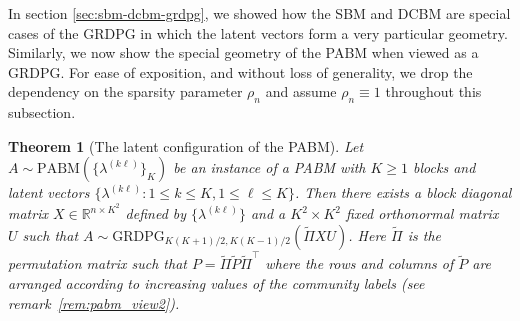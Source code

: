 \documentclass[
  12pt,
]{article}
\newtheorem{theorem}{Theorem}[section]
\theoremstyle{definition}
\theoremstyle{definition}
\theoremstyle{definition}
\theoremstyle{definition}
\theoremstyle{remark}
\begin{document}
In section \ref{sec:sbm-dcbm-grdpg}, we showed how the SBM and DCBM are special cases of the GRDPG in which the latent vectors form a very particular geometry.
Similarly, we now show the special geometry of the PABM when viewed as a GRDPG.
For ease of exposition, and without loss of generality, we drop the dependency on the sparsity parameter \(\rho_n\) and assume \(\rho_n \equiv 1\) throughout this subsection.

\begin{theorem}[The latent configuration of the PABM]
\label{thm:pabm-grdpg}
Let $A \sim \mathrm{PABM}(\{\lambda^{(k \ell)}\}_K)$ be an instance of a
PABM with $K \geq 1$ blocks and latent vectors $\{\lambda^{(k \ell)}
\colon 1 \leq k \leq K, 1 \leq \ell \leq K\}$. 
Then there exists a block diagonal matrix
$X \in \mathbb{R}^{n \times K^2}$ defined by $\{\lambda^{(k \ell)}\}$ and a 
$K^2 \times K^2$ {\em fixed} orthonormal matrix $U$ such 
that $A \sim \mathrm{GRDPG}_{K (K+1) / 2, K (K-1) /
2}(\tilde{\Pi}XU)$. Here $\tilde{\Pi}$ is the permutation matrix
such that $P = \tilde{\Pi} \tilde{P} \tilde{\Pi}^{\top}$ where the
rows and columns of $\tilde{P}$ are arranged according to increasing values of the
community labels (see remark~\ref{rem:pabm_view2}). 
\end{theorem}
\end{document}
